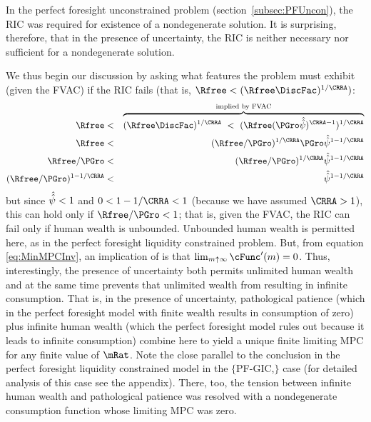 \documentclass[titlepage]{\econtex}\providecommand{\texname}{BufferStockTheory}%
\begin{document}
In the perfect foresight unconstrained problem
(section~\ref{subsec:PFUncon}), the RIC was required for existence of
a nondegenerate solution.  It is surprising, therefore, that in the
presence of uncertainty, the RIC is neither necessary nor sufficient
for a nondegenerate solution.
\begin{comment}
But if the RIC does hold, some useful results can be derived.  Arguably
the most fundamental are that the limiting values
for the minimal and maximal marginal propensities to consume implicit in
\eqref{eq:MaxMPCDef} and \eqref{eq:MinMPCInv} are positive and finite.
\end{comment}
We thus begin our discussion by asking what features the problem must
exhibit (given the FVAC) if the RIC fails (that is, $\Rfree < (\Rfree \DiscFac)^{1/\CRRA})$:
\begin{eqnarray}
    \Rfree  & < & \overbrace{(\Rfree \DiscFac)^{1/\CRRA} ~ < ~ (\Rfree (\PGro \uInvEpShkuInv)^{\CRRA-1})^{1/\CRRA}}^{\text{implied by FVAC}} \notag
\\  \Rfree  & < & (\Rfree/\PGro)^{1/\CRRA}\PGro \uInvEpShkuInv^{1-1/\CRRA} \notag
\\  \Rfree/\PGro & < & (\Rfree/\PGro)^{1/\CRRA}\uInvEpShkuInv^{1-1/\CRRA} \notag
\\  (\Rfree/\PGro)^{1-1/\CRRA} & < & \uInvEpShkuInv^{1-1/\CRRA} \label{eq:RICimplies}
\end{eqnarray}
but since $\hat{\hat{\psi}}<1$ and $0 < 1-1/\CRRA < 1$ (because we have
assumed $\CRRA > 1$), this can hold only if $\Rfree/\PGro < 1$; that
is, given the FVAC, the RIC can fail only if human wealth is
unbounded.  Unbounded human wealth is permitted here, as in the
perfect foresight liquidity constrained problem.  But,
 from  equation
\eqref{eq:MinMPCInv}, an implication of  is that $\lim_{m
  \uparrow \infty} \cFunc^{\prime}(m) = 0$.  Thus, interestingly,
the presence of uncertainty both permits unlimited human wealth and at
the same time prevents that unlimited wealth from resulting in
infinite consumption.  That is, in the presence of uncertainty,
pathological patience (which in the perfect foresight model with
finite wealth results in consumption of zero) plus infinite human
wealth (which the perfect foresight model rules out because it leads
to infinite consumption) combine here to yield a unique finite
limiting MPC for any finite value of $\mRat$.  Note
the close parallel to the conclusion in the perfect foresight
liquidity constrained model in the
$\{$PF-GIC,$\}$ case (for detailed analysis of this
case see the appendix).  There, too, the tension between infinite human wealth
and pathological patience was resolved with a nondegenerate consumption function
whose limiting MPC was zero.
\end{document}
